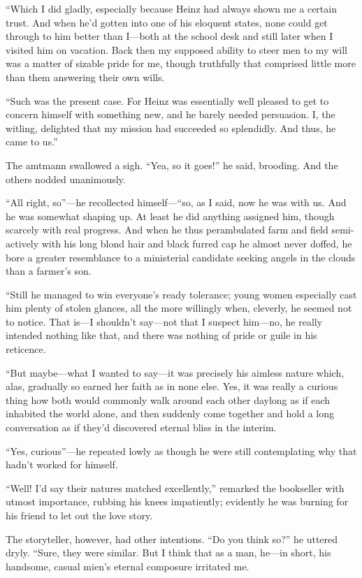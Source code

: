 \documentclass[12pt,a4paper]{article}
\begin{document}
“Which I did gladly, especially because Heinz had always shown me a certain trust. And when he’d gotten into one of his eloquent states, none could get through to him better than I—both at the school desk and still later when I visited him on vacation. Back then my supposed ability to steer men to my will was a matter of sizable pride for me, though truthfully that comprised little more than them answering their own wills.

“Such was the present case. For Heinz was essentially well pleased to get to concern himself with something new, and he barely needed persuasion. I, the witling, delighted that my mission had succeeded so splendidly. And thus, he came to us.”

The amtmann swallowed a sigh. “Yea, so it goes!” he said, brooding. And the others nodded unanimously.

“All right, so”—he recollected himself—“so, as I said, now he was with us. And he was somewhat shaping up. At least he did anything assigned him, though scarcely with real progress. And when he thus perambulated farm and field semi-actively with his long blond hair and black furred cap he almost never doffed, he bore a greater resemblance to a ministerial candidate seeking angels in the clouds than a farmer’s son.

“Still he managed to win everyone’s ready tolerance; young women especially cast him plenty of stolen glances, all the more willingly when, cleverly, he seemed not to notice. That is—I shouldn’t say—not that I suspect him—no, he really intended nothing like that, and there was nothing of pride or guile in his reticence.

“But maybe—what I wanted to say—it was precisely his aimless nature which, alas, gradually so earned her faith as in none else. Yes, it was really a curious thing how both would commonly walk around each other daylong as if each inhabited the world alone, and then suddenly come together and hold a long conversation as if they’d discovered eternal bliss in the interim.

“Yes, curious”—he repeated lowly as though he were still contemplating why that hadn’t worked for himself.

“Well! I’d say their natures matched excellently,” remarked the bookseller with utmost importance, rubbing his knees impatiently; evidently he was burning for his friend to let out the love story. 

The storyteller, however, had other intentions. “Do you think so?” he uttered dryly. “Sure, they were similar. But I think that as a man, he—in short, his handsome, casual mien’s eternal composure irritated me.
\end{document}
